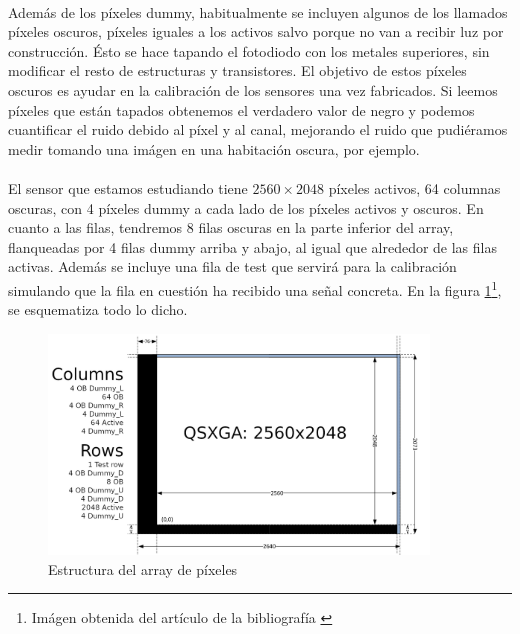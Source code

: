 \paragraph{}
Además de los píxeles dummy, habitualmente se incluyen algunos de los llamados
píxeles oscuros, píxeles iguales a los activos salvo porque no van a recibir luz
por construcción. Ésto se hace tapando el fotodiodo con los metales superiores,
sin modificar el resto de estructuras y transistores. El objetivo de estos píxeles
oscuros es ayudar en la calibración de los sensores una vez fabricados. Si
leemos píxeles que están tapados obtenemos el verdadero valor de negro y podemos
cuantificar el ruido debido al píxel y al canal, mejorando el ruido
que pudiéramos medir tomando una imágen en una habitación oscura, por ejemplo.

\paragraph{}
El sensor que estamos estudiando tiene $2560\times2048$ píxeles activos, 64 columnas
oscuras, con 4 píxeles dummy a cada lado de los píxeles activos y oscuros.
En cuanto a las filas, tendremos 8 filas oscuras en la parte inferior del array,
flanqueadas por 4 filas dummy arriba y abajo, al igual que alrededor de las filas
activas. Además se incluye una fila de test que servirá para la calibración simulando
que la fila en cuestión ha recibido una señal concreta. En la figura
\ref{fig:pxa_array}\footnote{Imágen obtenida del artículo de la bibliografía \cite{Jimenez-Garrido2012}},
se esquematiza todo lo dicho.

\begin{figure}
	\centering
	\includegraphics[width=0.9\textwidth]{img/pixel_array.png}
	\caption{Estructura del array de píxeles}
	\label{fig:pxa_array}
\end{figure}


